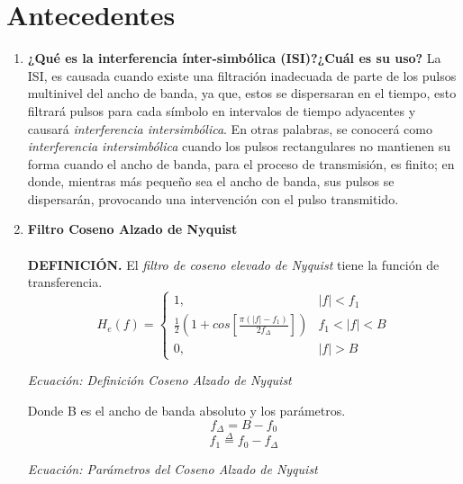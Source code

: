 \documentclass[lettersize,journal]{IEEEtran}
\begin{document}
\section{Antecedentes}\label{sec:Marcoteorico}

\begin{enumerate}
    \item \textbf{¿Qué es la interferencia ínter-simbólica (ISI)?¿Cuál es su uso?} \newline \newline 
La ISI, es causada cuando existe una filtración inadecuada de parte de los pulsos multinivel del ancho de banda, ya que, estos se dispersaran en el tiempo, esto filtrará pulsos para cada símbolo en intervalos de tiempo adyacentes y causará \textit{interferencia intersimbólica}.
\newline \newline
En otras palabras, se conocerá como \textit{interferencia intersimbólica} cuando los pulsos rectangulares no mantienen su forma cuando el ancho de banda, para el proceso de transmisión, es finito; en donde, mientras más pequeño sea el ancho de banda, sus pulsos se dispersarán, provocando una intervención con el pulso transmitido. \newline

\item \textbf{Filtro Coseno Alzado de Nyquist}\\\\
\textbf{DEFINICIÓN.} El \textit{filtro de coseno elevado de Nyquist} tiene la función de transferencia.
    \begin{equation}
        H_{e}(f)= \left\{\begin{array}{lcc}
             1, & |f| < f_{1} \\
             \frac{1}{2} (1 + cos[\frac{\pi(|f|-f_{1})}{2 f_{\Delta}}]) & f_{1}<|f|< B \\
             0, & |f| > B
        \end{array}
        \right.
    \end{equation}
\begin{center}
    \textit{Ecuación: Definición Coseno Alzado de Nyquist}
\end{center}

Donde B es el ancho de banda absoluto y los parámetros.\\

\begin{equation}
    f_{\Delta} = B - f_0
\end{equation}
\begin{equation}
    f_{1} \overset{\Delta}{=} f_{0} - f_{\Delta} 
\end{equation}
\begin{center}
    \textit{Ecuación: Parámetros del Coseno Alzado de Nyquist}    
\end{center}


\end{enumerate}
\end{document}
